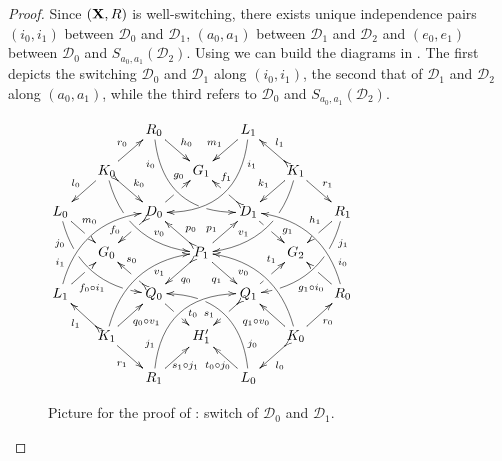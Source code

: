 \documentclass[a4paper,UKenglish,cleveref,pdftex,thm-restate,numberwithinsect]{lipics-v2021}
\def\R{\mathsf{R}}
\def\X{\textbf {\textup{X}}}
\newcommand{\dder}[1]{\mathscr{#1}}
\begin{document}
\begin{proof}   
	Since $(\X, \R)$ is well-switching, there exists unique independence pairs 
$(i_0,i_1)$ between $\dder{D}_0$ and $\dder{D}_1$,	$(a_0,a_1)$ between $\dder{D}_1$ and $\dder{D}_2$ and	$(e_0, e_1)$ between $\dder{D}_0$ and
	$S_{a_0,a_1}(\dder{D}_2)$. 	Using  we can build the diagrams in .  The first depicts the  switching $\dder{D}_0$ and $\dder{D}_1$ along  $(i_0, i_1)$, the second that of $\dder{D}_1$ and $\dder{D}_2$ along $(a_0, a_1)$, while the third refers to $\dder{D}_0$ and
	$S_{a_0,a_1}(\dder{D}_2)$.
	
	\begin{figure}[h]
		\centering
		$\xymatrix@C=15pt@R=15pt{&&R_0 \ar@/_.8cm/[ddrr]_(.2){i_0}|(.7)\hole
			\ar[dr]^{h_0}&& L_1\ar@/^.8cm/[ddll]^(.2){i_1}
			\ar[dl]_{m_1}\\&K_0\ar@{>->}[dr]^{k_0}\ar[dl]_{l_0}
			\ar@/_.6cm/[ddrr]|(.36)\hole^(.65){v_0}\ar[ur]^{r_0}&& G_1 &&
			K_1
			\ar@/^.6cm/[ddll]|(.36)\hole_(.65){v_1}\ar[dl]_{k_1}\ar@{>->}[lu]_{l_1}
			\ar[dr]^{r_1}\\L_0
			\ar@/_.6cm/[ddrr]_(.2){j_0}|(.31)\hole|(.81)\hole
			\ar[dr]^(.4){m_0}|(.61)\hole && D_0
			\ar@{>->}[dl]|(.4)\hole_(.65){f_0}\ar[ur]|(.5)\hole^(.7){g_0}&&D_1
			\ar[dr]|(.4)\hole^(.65){g_1}
			\ar@{>->}[ul]|(.5)\hole_(.65){f_1}&&R_1\ar@/^.6cm/[ddll]^(.2){j_1}|(.31)\hole|(.81)\hole\ar[dl]_(.4){h_1}|(.6)\hole\\&G_0
			&&P_1\ar[dr]_{q_1}
			\ar@{>->}[dl]^{q_0}\ar[ur]^(.4){p_1}\ar@{>->}[ul]_(.4){p_0}&&G_2\\L_1
			\ar@/^.6cm/[uurr]^(.2){i_1} \ar[ur]_(.35){f_0\circ
				i_1}|(.61)\hole&&Q_0
			\ar@{>->}[ul]|(.4)\hole_(.65){s_0}\ar[dr]|(.5)\hole^(.65){t_0}
			&&Q_1\ar[ur]|(.4)\hole^(.65){t_1} \ar@{>->}[dl]|(.5)\hole_(.65){s_1}
			&& R_0 \ar[ul]^(.35){g_1\circ
				i_0}|(.61)\hole\ar@/_.6cm/[uull]_(.2){i_0}\\&K_1
			\ar[ur]_{q_0\circ v_1} \ar[dr]_{r_1}
			\ar@{>->}[ul]^{l_1}\ar@/^.6cm/[uurr]_(.65){v_1}&&H'_1&& K_0
			\ar[ur]_{r_0} \ar[ul]^{q_1\circ v_0} \ar@{>->}[dl]^{l_0}
			\ar@/_.6cm/[uull]^(.65){v_0}\\&& R_1
			\ar[ur]_{\hspace{-6pt}s_1\circ
				j_1}\ar@/^.8cm/[uurr]^(.2){j_1}&& L_0 \ar[ul]^{t_0\circ
				j_0\hspace{-6pt}} \ar@/_.8cm/[uull]_(.2){j_0} |(.69)\hole
		}	$
		\caption{Picture for the proof of : switch of $\dder{D}_0$ and $\dder{D}_1$.}
		\label{fi:first}
	\end{figure}
	

\end{proof}
\end{document}
